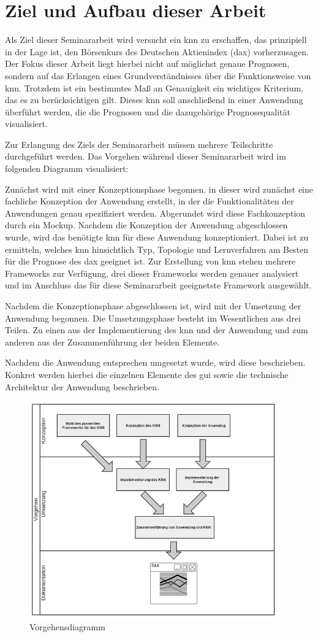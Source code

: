 \section{Ziel und Aufbau dieser Arbeit}
\label{section:Ziel}
Als Ziel dieser Seminararbeit wird versucht ein \ac{knn} zu erschaffen, das prinzipiell in der Lage ist, den Börsenkurs des Deutschen Aktienindex (\acs{dax}) vorherzusagen. Der Fokus dieser Arbeit liegt hierbei nicht auf möglichst genaue Prognosen, sondern auf das Erlangen eines Grundverständnisses über die Funktionsweise von \ac{knn}. Trotzdem ist ein bestimmtes Maß an Genauigkeit ein wichtiges Kriterium, das es zu berücksichtigen gilt. Dieses \ac{knn} soll anschließend in einer Anwendung überführt werden, die die Prognosen und die dazugehörige Prognosequalität visualisiert.

Zur Erlangung des Ziels der Seminararbeit müssen mehrere Teilschritte durchgeführt werden. Das Vorgehen während dieser Seminararbeit wird im folgenden Diagramm visualisiert:
 
 Zunächst wird mit einer Konzeptionsphase begonnen. in dieser wird zunächst eine fachliche Konzeption der Anwendung erstellt, in der die Funktionalitäten der Anwendungen genau spezifiziert werden. Abgerundet wird diese Fachkonzeption durch ein Mockup. Nachdem die Konzeption der Anwendung abgeschlossen wurde, wird das benötigte \ac{knn} für diese Anwendung konzeptioniert. Dabei ist zu ermitteln, welches \ac{knn} hinsichtlich Typ, Topologie und Lernverfahren am Besten für die Prognose des \ac{dax} geeignet ist. Zur Erstellung von \ac{knn} stehen mehrere Frameworks zur Verfügung, drei dieser Frameworks werden genauer analysiert und im Anschluss das für diese Seminararbeit geeignetste Framework ausgewählt.

Nachdem die Konzeptionsphase abgeschlossen ist, wird mit der Umsetzung der Anwendung begonnen. Die Umsetzungsphase besteht im Wesentlichen aus drei Teilen. Zu einen aus der Implementierung des \ac{knn} und der Anwendung und zum anderen aus der Zusammenführung der beiden Elemente. 

Nachdem die Anwendung entsprechen umgesetzt wurde, wird diese beschrieben. Konkret werden hierbei die einzelnen Elemente des \ac{gui} sowie die technische Architektur der Anwendung beschrieben.

\begin{figure}[H]
\centering
		\includegraphics[width=0.95\textwidth]{Vorgehensdiagramm.PNG}
	\caption{Vorgehensdiagramm}
	\label{fig:Vorgehensdiagramm}
\end{figure}

